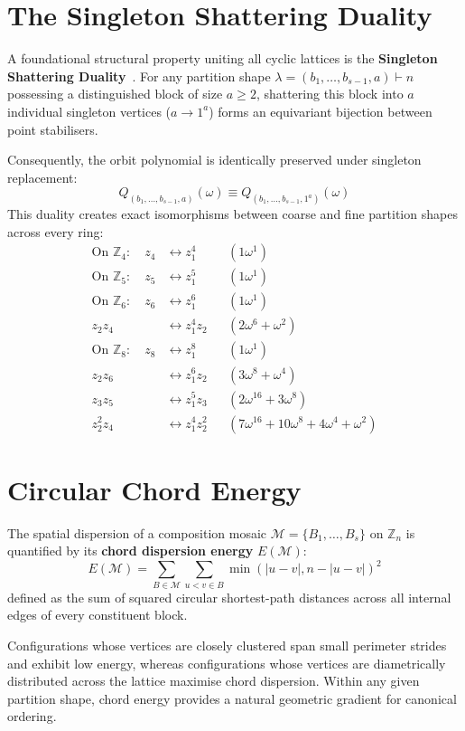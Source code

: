 \section{The Singleton Shattering Duality}

A foundational structural property uniting all cyclic lattices is the \textbf{Singleton Shattering Duality}~\cite{Joyal1981,Kerber1999}. For any partition shape $\lambda = (b_1, \dots, b_{s-1}, a) \vdash n$ possessing a distinguished block of size $a \ge 2$, shattering this block into $a$ individual singleton vertices ($a \to 1^a$) forms an equivariant bijection between point stabilisers.

Consequently, the orbit polynomial is identically preserved under singleton replacement:
\begin{equation}
Q_{(b_1, \dots, b_{s-1}, a)}(\omega) \equiv Q_{(b_1, \dots, b_{s-1}, 1^a)}(\omega)
\end{equation}
This duality creates exact isomorphisms between coarse and fine partition shapes across every ring:
\begin{align}
\text{On } \mathbb{Z}_4\colon \quad z_4 &\longleftrightarrow z_1^4 && (1\omega^1) \\
\text{On } \mathbb{Z}_5\colon \quad z_5 &\longleftrightarrow z_1^5 && (1\omega^1) \\
\text{On } \mathbb{Z}_6\colon \quad z_6 &\longleftrightarrow z_1^6 && (1\omega^1) \\
z_2 z_4 &\longleftrightarrow z_1^4 z_2 && (2\omega^6 + \omega^2) \\
\text{On } \mathbb{Z}_8\colon \quad z_8 &\longleftrightarrow z_1^8 && (1\omega^1) \\
z_2 z_6 &\longleftrightarrow z_1^6 z_2 && (3\omega^8 + \omega^4) \\
z_3 z_5 &\longleftrightarrow z_1^5 z_3 && (2\omega^{16} + 3\omega^8) \\
z_2^2 z_4 &\longleftrightarrow z_1^4 z_2^2 && (7\omega^{16} + 10\omega^8 + 4\omega^4 + \omega^2)
\end{align}

\section{Circular Chord Energy}

The spatial dispersion of a composition mosaic $\mathcal{M} = \{B_1, \dots, B_s\}$ on $\mathbb{Z}_n$ is quantified by its \textbf{chord dispersion energy} $E(\mathcal{M})$:
\begin{equation}
E(\mathcal{M}) = \sum_{B \in \mathcal{M}} \sum_{u < v \in B} \min(|u - v|, n - |u - v|)^2
\end{equation}
defined as the sum of squared circular shortest-path distances across all internal edges of every constituent block. 

Configurations whose vertices are closely clustered span small perimeter strides and exhibit low energy, whereas configurations whose vertices are diametrically distributed across the lattice maximise chord dispersion. Within any given partition shape, chord energy provides a natural geometric gradient for canonical ordering.
